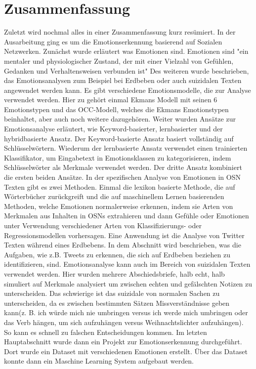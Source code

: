 \documentclass[conference]{IEEEtran}
\begin{document}
\section{Zusammenfassung}
Zuletzt wird nochmal alles in einer Zusammenfassung kurz resümiert.
In der Ausarbeitung ging es um die Emotionserkennung basierend auf Sozialen Netzwerken.
Zunächst wurde erläutert was Emotionen sind.
Emotionen sind "ein mentaler und physiologischer Zustand, der mit einer Vielzahl von Gefühlen, Gedanken und Verhaltensweisen verbunden ist"
Des weiteren wurde beschrieben, das Emotionsanalysen zum Beispiel bei Erdbeben oder auch suizidalen Texten angewendet werden kann.
Es gibt verschiedene Emotionsmodelle, die zur Analyse verwendet werden. Hier zu gehört einmal Ekmans Modell mit seinen 6 Emotionstypen und das OCC-Modell, welches die Ekmans Emotionstypen beinhaltet, aber auch noch weitere dazugehören.
Weiter wurden Ansätze zur Emotionsanalyse erläutert, wie Keyword-basierter, lernbasierter und der hybridbasierte Ansatz. Der Keyword-basierte Ansatz basiert vollständig auf Schlüsselwörtern. Wiederum der lernbasierte Ansatz verwendet einen trainierten Klassifikator, um Eingabetext in Emotionsklassen zu kategorisieren, indem Schlüsselwörter als Merkmale verwendet werden.
Der dritte Ansatz kombiniert die ersten beiden Ansätze.
In der spezifischen Analyse von Emotionen in OSN Texten gibt es zwei Methoden. Einmal die lexikon basierte Methode, die auf Wörterbücher zurückgreift und die auf maschinellem Lernen basierenden Methoden, welche Emotionen normalerweise erkennen, indem sie Arten von Merkmalen aus Inhalten in OSNs extrahieren und dann Gefühle oder Emotionen unter Verwendung verschiedener Arten von Klassifizierungs- oder Regressionsmodellen vorhersagen.
Eine Anwendung ist die Analyse von Twitter Texten während eines Erdbebens. In dem Abschnitt wird beschrieben, was die Aufgaben, wie z.B. Tweets zu erkennen, die sich auf Erdbeben beziehen zu identifizieren, sind.
Emotionsanalyse kann auch im Bereich von suizidalen Texten verwendet werden. Hier wurden mehrere Abschiedsbriefe, halb echt, halb simuliert auf Merkmale analysiert um zwischen echten und gefälschten Notizen zu unterscheiden. Das schwierige ist das suizidale von normalen Sachen zu unterscheiden, da es zwischen bestimmten Sätzen Missverständnisse geben kann(z. B. ich würde mich nie umbringen versus ich werde mich umbringen oder das Verb hängen, um sich aufzuhängen versus Weihnachtslichter aufzuhängen). So kann es schnell zu falschen Entscheidungen kommen.
Im letzten Hauptabschnitt wurde dann ein Projekt zur Emotionserkennung durchgeführt. Dort wurde ein Dataset mit verschiedenen Emotionen erstellt. Über das Dataset konnte dann ein Maschine Learning System aufgebaut werden.
\end{document}
